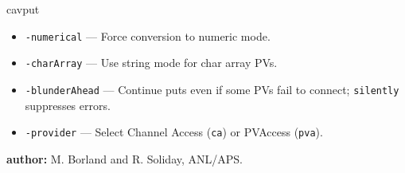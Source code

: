 \begin{sddsprog}{cavput}
\begin{itemize}
      \item {\tt -numerical} --- Force conversion to numeric mode.
      \item {\tt -charArray} --- Use string mode for char array PVs.
      \item {\tt -blunderAhead} --- Continue puts even if some PVs fail to connect; \verb|silently| suppresses errors.
      \item {\tt -provider} --- Select Channel Access ({\tt ca}) or PVAccess ({\tt pva}).
    \end{itemize}
  \item \textbf{author:} M. Borland and R. Soliday, ANL/APS.
\end{sddsprog}
